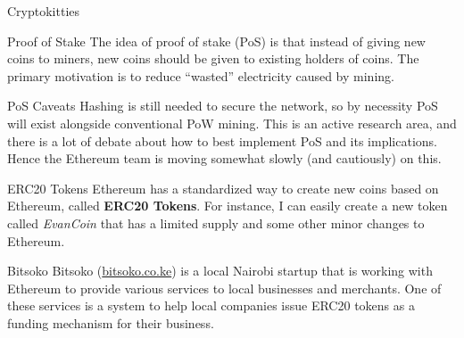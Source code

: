 \documentclass[14pt]{beamer}
\begin{document}
\begin{frame}{Cryptokitties}
\end{frame}

\begin{frame}{Proof of Stake}
  The idea of proof of stake (PoS) is that instead of giving new coins to miners, new
  coins should be given to existing holders of coins.
  \newline
  \newline
  The primary motivation is to reduce ``wasted'' electricity caused by mining.
\end{frame}

\begin{frame}{PoS Caveats}
  Hashing is still needed to secure the network, so by necessity PoS will exist
  alongside conventional PoW mining.
  \newline
  \newline
  This is an active research area, and there is a lot of debate about how to
  best implement PoS and its implications. Hence the Ethereum team is moving
  somewhat slowly (and cautiously) on this.
\end{frame}

\begin{frame}{ERC20 Tokens}
  Ethereum has a standardized way to create new coins based on Ethereum, called
  \textbf{ERC20 Tokens}.
  \newline
  \newline
  For instance, I can easily create a new token called \emph{EvanCoin} that has a
  limited supply and some other minor changes to Ethereum.
\end{frame}

\begin{frame}{Bitsoko}
  Bitsoko (\href{https://bitsoko.co.ke}{bitsoko.co.ke}) is a local Nairobi
  startup that is working with Ethereum to provide various services to local
  businesses and merchants.
  \newline
  \newline
  One of these services is a system to help local companies issue ERC20 tokens
  as a funding mechanism for their business.
\end{frame}
\end{document}
